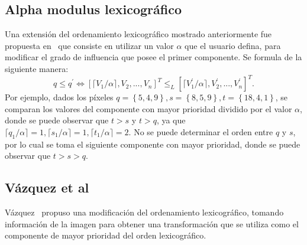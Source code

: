 \subsection{Alpha modulus lexicográfico}
\label{chap:marco-alphalex}
Una extensión del ordenamiento lexicográfico mostrado anteriormente fue propuesta en~\cite{angulo2003morphologie} que consiste en utilizar un valor $\alpha$ que el usuario defina, para modificar el grado de influencia que posee el primer componente. Se formula de la siguiente manera:
 
 
\begin{equation}
q \leq q^{\prime} \Leftrightarrow \left[  \lceil V_{1}/\alpha\rceil , V_{2},...,V_{n} \right]^{T} \leq_{L} \left[  \lceil V^{\prime}_{1}/\alpha\rceil, V^{\prime}_{2},...,V^{\prime}_{n} \right]^{T}.
\end{equation}
Por ejemplo, dados los píxeles $q=\left\{5,4,9\right\}, s=\left\{8,5,9\right\}, t=\left\{18,4,1\right\}$, se comparan los valores del componente con mayor prioridad dividido por el valor $\alpha$, donde se puede observar que $t>s$ y $t>q$, ya que $\lceil q_{1}/\alpha\rceil = 1,\lceil s_{1}/\alpha\rceil = 1,\lceil t_{1}/\alpha\rceil = 2$. No se puede determinar el orden entre $q$ y $s$, por lo cual se toma el siguiente componente con mayor prioridad, donde se puede observar que $t>s>q$.


\subsection{Vázquez et al}
\label{chap:marco-vazquez}
   
 

Vázquez~\cite{noguera2014color} propuso una modificación del ordenamiento lexicográfico, tomando información de la imagen para obtener una transformación que se utiliza como el componente de mayor prioridad del orden lexicográfico.

